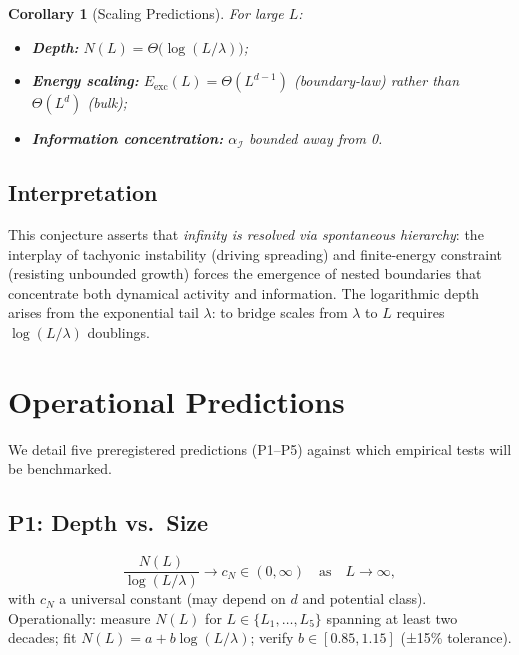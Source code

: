 \documentclass{article}
\newtheorem{corollary}{Corollary}
\begin{document}
\begin{corollary}[Scaling Predictions]
\label{cor:scaling}
For large $L$:
\begin{itemize}
    \item \textbf{Depth:} $N(L)=\Theta\!\big(\log(L/\lambda)\big)$;
    \item \textbf{Energy scaling:} $E_{\text{exc}}(L)=\Theta(L^{d-1})$ (boundary-law) rather than $\Theta(L^d)$ (bulk);
    \item \textbf{Information concentration:} $\alpha_\mathcal{I}$ bounded away from 0.
\end{itemize}
\end{corollary}

\subsection{Interpretation}

This conjecture asserts that \emph{infinity is resolved via spontaneous hierarchy}: the interplay of tachyonic instability (driving spreading) and finite-energy constraint (resisting unbounded growth) forces the emergence of nested boundaries that concentrate both dynamical activity and information. The logarithmic depth arises from the exponential tail $\lambda$: to bridge scales from $\lambda$ to $L$ requires $\log(L/\lambda)$ doublings.

\section{Operational Predictions}
\label{sec:predictions}

We detail five preregistered predictions (P1--P5) against which empirical tests will be benchmarked.

\subsection{P1: Depth vs.\ Size}

\begin{equation}
\frac{N(L)}{\log(L/\lambda)} \to c_N \in (0,\infty) \quad\text{as}\quad L\to\infty,
\end{equation}
with $c_N$ a universal constant (may depend on $d$ and potential class). Operationally: measure $N(L)$ for $L\in\{L_1,\dots,L_5\}$ spanning at least two decades; fit $N(L) = a + b\log(L/\lambda)$; verify $b\in[0.85, 1.15]$ (±15\% tolerance).
\end{document}
